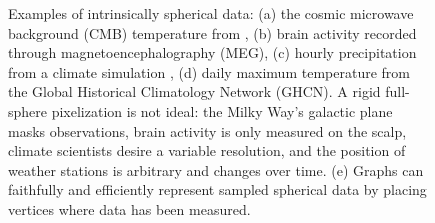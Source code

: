 \documentclass{article} %
\newcommand{\todo}[1]{{\color[rgb]{.6,.1,.6}{#1}}}
\begin{document}
\begin{figure}[h]
	\centering
	 \hfill
	 \hspace{0.1em}
	 \hfill
	 \hfill
	\caption{
		Examples of intrinsically spherical data:
		(a) the cosmic microwave background (CMB) temperature from \citet{planck2015overview},
		(b) brain activity recorded through magnetoencephalography (MEG),\protect\footnotemark
		(c) hourly precipitation from a climate simulation \citep{jiang2019sphericalcnn}, %
		(d) daily maximum temperature from the Global Historical Climatology Network (GHCN).\protect\footnotemark
		A rigid full-sphere pixelization is not ideal: the Milky Way's galactic plane masks observations, brain activity is only measured on the scalp, climate scientists desire a variable resolution, and the position of weather stations is arbitrary and changes over time.
		(e) Graphs can faithfully and efficiently represent sampled spherical data by placing vertices where data has been measured.
	}
	\label{fig:examples}
\end{figure}
\end{document}
